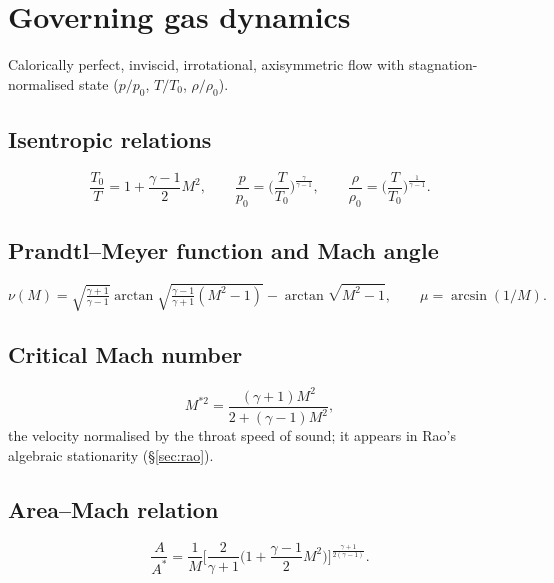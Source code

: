 \documentclass[11pt]{article}
\begin{document}
\section{Governing gas dynamics}
Calorically perfect, inviscid, irrotational, axisymmetric flow with
stagnation-normalised state ($p/p_0$, $T/T_0$, $\rho/\rho_0$).

\subsection{Isentropic relations}
\begin{equation}
\frac{T_0}{T} = 1+\frac{\gamma-1}{2}M^2,\qquad
\frac{p}{p_0}=\Big(\frac{T}{T_0}\Big)^{\frac{\gamma}{\gamma-1}},\qquad
\frac{\rho}{\rho_0}=\Big(\frac{T}{T_0}\Big)^{\frac{1}{\gamma-1}}.
\end{equation}

\subsection{Prandtl--Meyer function and Mach angle}
\begin{equation}
\nu(M)=\sqrt{\tfrac{\gamma+1}{\gamma-1}}
\arctan\!\sqrt{\tfrac{\gamma-1}{\gamma+1}(M^2-1)}-\arctan\!\sqrt{M^2-1},
\qquad \mu = \arcsin(1/M).
\end{equation}

\subsection{Critical Mach number}
\begin{equation}
M^{*2} = \frac{(\gamma+1)M^2}{2+(\gamma-1)M^2},
\end{equation}
the velocity normalised by the throat speed of sound; it appears in
Rao's algebraic stationarity (\S\ref{sec:rao}).

\subsection{Area--Mach relation}
\begin{equation}
\frac{A}{A^*}=\frac{1}{M}\Big[\frac{2}{\gamma+1}
\Big(1+\frac{\gamma-1}{2}M^2\Big)\Big]^{\frac{\gamma+1}{2(\gamma-1)}} .
\end{equation}

\end{document}
